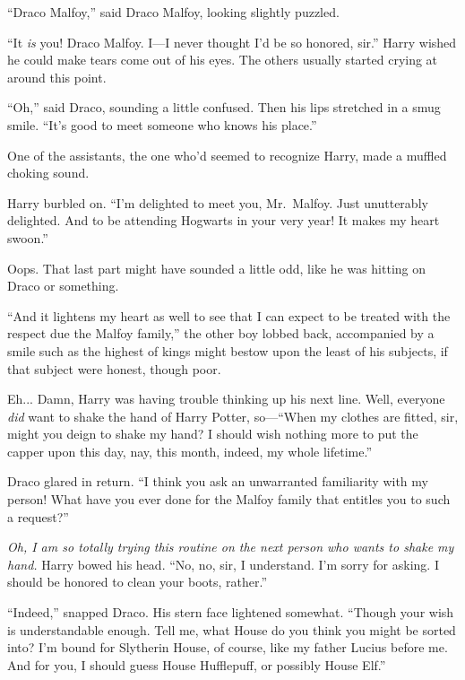 “Draco Malfoy,” said Draco Malfoy, looking slightly puzzled.

“It \emph{is} you! Draco Malfoy. I—I never thought I’d be so honored, sir.” Harry wished he could make tears come out of his eyes. The others usually started crying at around this point.

“Oh,” said Draco, sounding a little confused. Then his lips stretched in a smug smile. “It’s good to meet someone who knows his place.”

One of the assistants, the one who’d seemed to recognize Harry, made a muffled choking sound.

Harry burbled on. “I’m delighted to meet you, Mr.~Malfoy. Just unutterably delighted. And to be attending Hogwarts in your very year! It makes my heart swoon.”

Oops. That last part might have sounded a little odd, like he was hitting on Draco or something.

“And it lightens my heart as well to see that I can expect to be treated with the respect due the Malfoy family,” the other boy lobbed back, accompanied by a smile such as the highest of kings might bestow upon the least of his subjects, if that subject were honest, though poor.

Eh... Damn, Harry was having trouble thinking up his next line. Well, everyone \emph{did} want to shake the hand of Harry Potter, so—“When my clothes are fitted, sir, might you deign to shake my hand? I should wish nothing more to put the capper upon this day, nay, this month, indeed, my whole lifetime.”

Draco glared in return. “I think you ask an unwarranted familiarity with my person! What have you ever done for the Malfoy family that entitles you to such a request?”

\emph{Oh, I am so totally trying this routine on the next person who wants to shake my hand.} Harry bowed his head. “No, no, sir, I understand. I’m sorry for asking. I should be honored to clean your boots, rather.”

\begin{underfull}

“Indeed,” snapped Draco. His stern face lightened somewhat. “Though your wish is understandable enough. Tell me, what House do you think you might be sorted into? I’m bound for Slytherin House, of course, like my father Lucius before me. And for you, I should guess House Hufflepuff, or possibly House Elf.”

\end{underfull}


